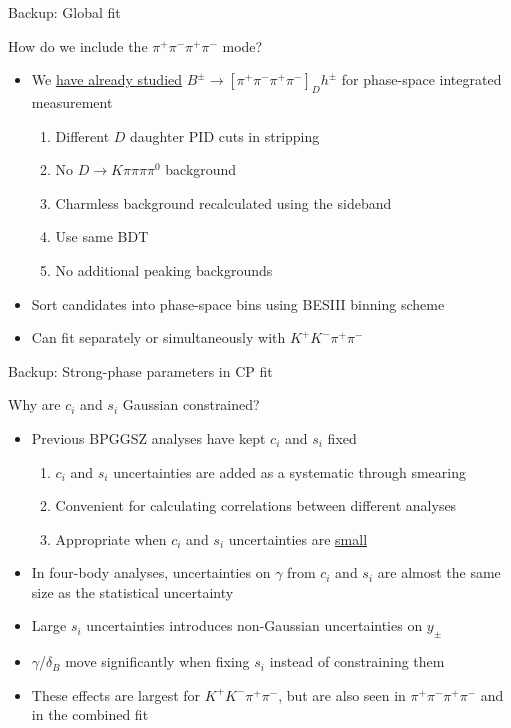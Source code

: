 \documentclass[xcolor={dvipsnames}]{beamer}
\begin{document}
\begin{frame}{Backup: Global fit}
  \begin{center}
    {\large How do we include the $\pi^+\pi^-\pi^+\pi^-$ mode?}
  \end{center}
  \begin{itemize}
    \setlength\itemsep{1.5em}
    \item{We \underline{have already studied} $B^\pm\to[\pi^+\pi^-\pi^+\pi^-]_Dh^\pm$ for phase-space integrated measurement}
    \begin{enumerate}
      \setlength\itemsep{0.5em}
      \item{Different $D$ daughter PID cuts in stripping}
      \item{No $D\to K\pi\pi\pi\pi^0$ background}
      \item{Charmless background recalculated using the sideband}
      \item{Use same BDT}
      \item{No additional peaking backgrounds}
    \end{enumerate}
    \item{Sort candidates into phase-space bins using BESIII binning scheme}
    \item{Can fit separately or simultaneously with $K^+K^-\pi^+\pi^-$}
  \end{itemize}
\end{frame}

\begin{frame}{Backup: Strong-phase parameters in CP fit}
  \begin{center}
    {\large Why are $c_i$ and $s_i$ Gaussian constrained?}
  \end{center}
  \begin{itemize}
    \setlength\itemsep{1.0em}
    \item{Previous BPGGSZ analyses have kept $c_i$ and $s_i$ fixed}
    \begin{enumerate}
      \item{$c_i$ and $s_i$ uncertainties are added as a systematic through smearing}
      \item{Convenient for calculating correlations between different analyses}
      \item{Appropriate when $c_i$ and $s_i$ uncertainties are \underline{small}}
    \end{enumerate}
    \item{In four-body analyses, uncertainties on $\gamma$ from $c_i$ and $s_i$ are almost the same size as the statistical uncertainty}
    \item{Large $s_i$ uncertainties introduces non-Gaussian uncertainties on $y_\pm$}
    \item{$\gamma$/$\delta_B$ move significantly when fixing $s_i$ instead of constraining them}
    \item{These effects are largest for $K^+K^-\pi^+\pi^-$, but are also seen in $\pi^+\pi^-\pi^+\pi^-$ and in the combined fit}
  \end{itemize}
\end{frame}
\end{document}
